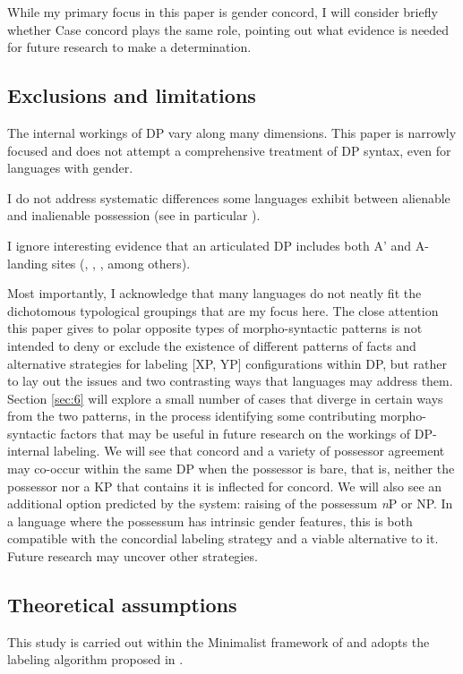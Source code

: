 \documentclass[output=paper
,modfonts
,nonflat]{langsci/langscibook}
\begin{document}
While my primary focus in this paper is gender concord, I will consider briefly whether Case concord plays the same role, pointing out what evidence is needed for future research to make a determination.

\subsection{Exclusions and limitations} \label{sec:1.3}
The internal workings of DP vary along many dimensions. This paper is narrowly focused and does not attempt a comprehensive treatment of DP syntax, even for languages with gender.

I do not address systematic differences some languages exhibit between alienable and inalienable possession (see in particular \citealt{Den_Dikken2015}).     

I ignore interesting evidence that an articulated DP includes both A' and A-landing sites (\citealt{Szabolcsi1983}, \citealt{Gavruseva2000}, \citealt{Alexiadou2001}, \citealt{Haegeman2004} among others).    

Most importantly, I acknowledge that many languages do not neatly fit the dichotomous typological groupings that are my focus here. The close attention this paper gives to polar opposite types of morpho-syntactic patterns is not intended to deny or exclude the existence of different patterns of facts and alternative strategies for labeling [XP, YP] configurations within DP, but rather to lay out the issues and two contrasting ways that languages may address them. Section \ref{sec:6} will explore a small number of cases that diverge in certain ways from the two patterns, in the process identifying some contributing morpho-syntactic factors that may be useful in future research on the workings of DP-internal labeling. We will see that concord and a variety of possessor agreement may co-occur within the same DP when the possessor is bare, that is, neither the possessor nor a KP that contains it is inflected for concord. We will also see an additional option predicted by the system: raising of the possessum \textit{n}P or NP. In a language where the possessum has intrinsic gender features, this is both compatible with the concordial labeling strategy and a viable alternative to it. Future research may uncover other strategies.    

\subsection{Theoretical assumptions} \label{sec:1.4}
This study is carried out within the Minimalist framework of \citet{Chomsky2000, Chomsky2001} and adopts the labeling algorithm proposed in \citet{Chomsky2013, Chomsky2015}. 
\end{document}
